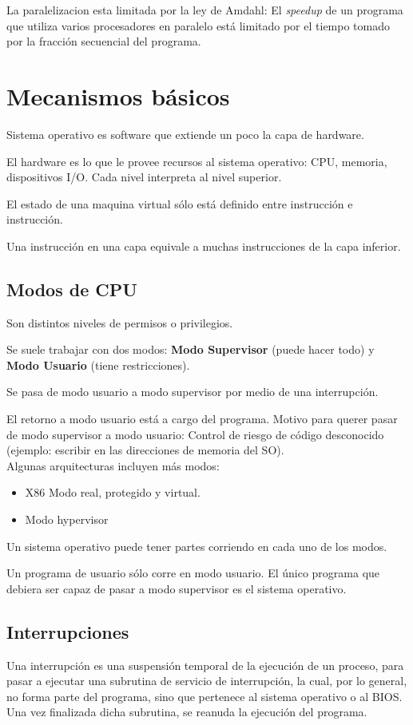 \documentclass[a4paper, twoside]{article}
\begin{document}
La paralelizacion esta limitada por la ley de Amdahl: El \emph{speedup} de un programa que utiliza varios procesadores en paralelo está limitado por el tiempo tomado por la fracción secuencial del programa.

\newpage
\section{Mecanismos básicos}
Sistema operativo es software que extiende un poco la capa de hardware.

El hardware es lo que le provee recursos al sistema operativo: CPU, memoria, dispositivos I/O. Cada nivel interpreta al nivel superior.

El estado de una maquina virtual sólo está definido entre instrucción e instrucción.

Una instrucción en una capa equivale a muchas instrucciones de la capa inferior.

\subsection{Modos de CPU}
Son distintos niveles de permisos o privilegios.

Se suele trabajar con dos modos: \textbf{Modo Supervisor} (puede hacer todo) y \textbf{Modo Usuario} (tiene restricciones).

Se pasa de modo usuario a modo supervisor por medio de una interrupción. 

El retorno a modo usuario está a cargo del programa. Motivo para querer pasar de modo supervisor a modo usuario: Control de riesgo de código desconocido (ejemplo: escribir en las direcciones de memoria del SO).\\

Algunas arquitecturas incluyen más modos:
\begin{itemize}
	\item X86 Modo real, protegido y virtual.
	\item Modo hypervisor
\end{itemize}

Un sistema operativo puede tener partes corriendo en cada uno de los modos.

Un programa de usuario sólo corre en modo usuario. El único programa que debiera ser capaz de pasar a modo supervisor es el sistema operativo.

\subsection{Interrupciones}
Una interrupción es una suspensión temporal de la ejecución de un proceso, para pasar a ejecutar una subrutina de servicio de interrupción, la cual, por lo general, no forma parte del programa, sino que pertenece al sistema operativo o al BIOS. Una vez finalizada dicha subrutina, se reanuda la ejecución del programa.\\
\end{document}
